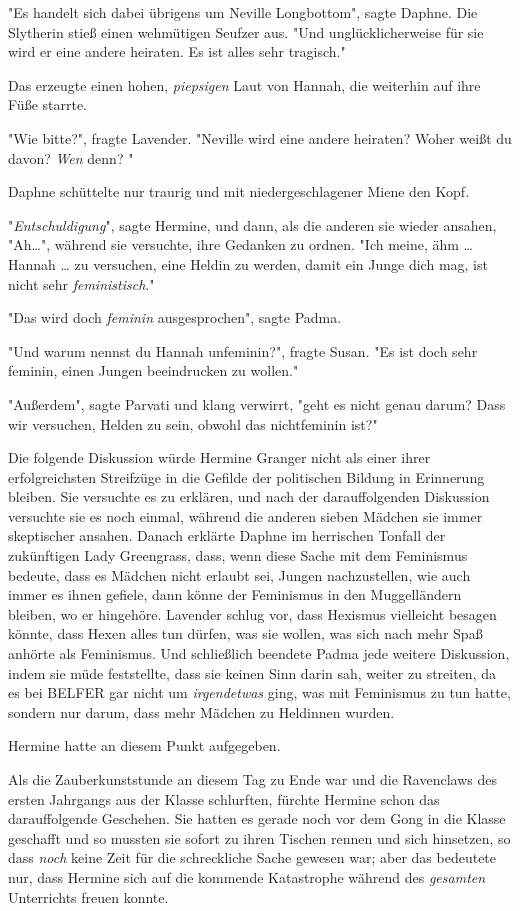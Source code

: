 {"Es handelt sich dabei übrigens um Neville Longbottom", sagte Daphne. Die Slytherin stieß einen wehmütigen Seufzer aus. "Und unglücklicherweise für sie wird er eine andere heiraten. Es ist alles sehr tragisch."

Das erzeugte einen hohen, \emph{piepsigen} Laut von Hannah, die weiterhin auf ihre Füße starrte.

"Wie bitte?", fragte Lavender. "Neville wird eine andere heiraten? Woher weißt du davon? \emph{Wen} denn? "

Daphne schüttelte nur traurig und mit niedergeschlagener Miene den Kopf.

"\emph{Entschuldigung}", sagte Hermine, und dann, als die anderen sie wieder ansahen, "Ah…", während sie versuchte, ihre Gedanken zu ordnen. "Ich meine, ähm … Hannah … zu versuchen, eine Heldin zu werden, damit ein Junge dich mag, ist nicht sehr \emph{feministisch}."

"Das wird doch \emph{feminin} ausgesprochen", sagte Padma.

"Und warum nennst du Hannah unfeminin?", fragte Susan. "Es ist doch sehr feminin, einen Jungen beeindrucken zu wollen."

"Außerdem", sagte Parvati und klang verwirrt, "geht es nicht genau darum? Dass wir versuchen, Helden zu sein, obwohl das nichtfeminin ist?"

Die folgende Diskussion würde Hermine Granger nicht als einer ihrer erfolgreichsten Streifzüge in die Gefilde der politischen Bildung in Erinnerung bleiben. Sie versuchte es zu erklären, und nach der darauffolgenden Diskussion versuchte sie es noch einmal, während die anderen sieben Mädchen sie immer skeptischer ansahen. Danach erklärte Daphne im herrischen Tonfall der zukünftigen Lady Greengrass, dass, wenn diese Sache mit dem Feminismus bedeute, dass es Mädchen nicht erlaubt sei, Jungen nachzustellen, wie auch immer es ihnen gefiele, dann könne der Feminismus in den Muggelländern bleiben, wo er hingehöre. Lavender schlug vor, dass Hexismus vielleicht besagen könnte, dass Hexen alles tun dürfen, was sie wollen, was sich nach mehr Spaß anhörte als Feminismus. Und schließlich beendete Padma jede weitere Diskussion, indem sie müde feststellte, dass sie keinen Sinn darin sah, weiter zu streiten, da es bei BELFER gar nicht um \emph{irgendetwas} ging, was mit Feminismus zu tun hatte, sondern nur darum, dass mehr Mädchen zu Heldinnen wurden.

Hermine hatte an diesem Punkt aufgegeben.

Als die Zauberkunststunde an diesem Tag zu Ende war und die Ravenclaws des ersten Jahrgangs aus der Klasse schlurften, fürchte Hermine schon das darauffolgende Geschehen. Sie hatten es gerade noch vor dem Gong in die Klasse geschafft und so mussten sie sofort zu ihren Tischen rennen und sich hinsetzen, so dass \emph{noch} keine Zeit für die schreckliche Sache gewesen war; aber das bedeutete nur, dass Hermine sich auf die kommende Katastrophe während des \emph{gesamten} Unterrichts freuen konnte.

}
